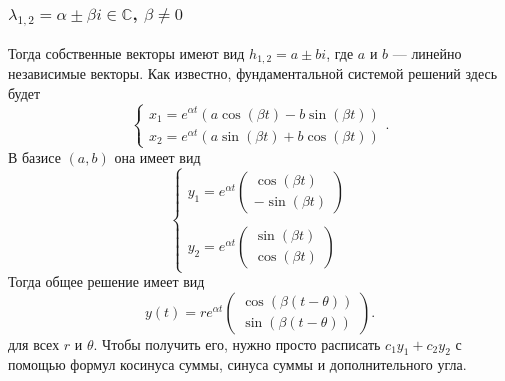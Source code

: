 \subsubsection{$\lambda_{1, 2} = \alpha \pm \beta i \in \mathbb{C}$, $\beta \neq 0$}
Тогда собственные векторы имеют вид $h_{1,2} = a \pm b i$, где $a$ и $b$ --- линейно независимые векторы.
Как известно, фундаментальной системой решений здесь будет
\[
    \begin{cases}
        x_1 = e^{\alpha t}(a \cos(\beta t) - b \sin(\beta t)) \\
        x_2 = e^{\alpha t}(a \sin(\beta t) + b \cos(\beta t))
    \end{cases}.
\]
В базисе $(a, b)$ она имеет вид
\[
    \begin{cases}
        y_1 = e^{\alpha t}
        \begin{pmatrix}
            \cos(\beta t) \\
            -\sin(\beta t)
        \end{pmatrix} \\\\

        y_2 = e^{\alpha t}
        \begin{pmatrix}
            \sin(\beta t) \\
            \cos(\beta t)
        \end{pmatrix}
    \end{cases}
\]
Тогда общее решение имеет вид
\[
    y(t) = r e^{\alpha t}
    \begin{pmatrix}
        \cos(\beta (t - \theta)) \\
        \sin(\beta (t - \theta))
    \end{pmatrix}.
\]
для всех $r$ и $\theta$. Чтобы получить его, нужно просто расписать $c_1 y_1 + c_2 y_2$ с помощью формул косинуса суммы, синуса суммы и дополнительного угла.

